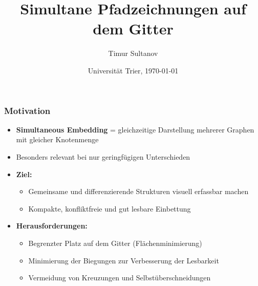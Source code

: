 \documentclass[9pt]{beamer}
\title{Simultane Pfadzeichnungen auf dem Gitter}
\author{Timur Sultanov}
\date{Universität Trier, \today}
\begin{document}
    \maketitle
    \begin{frame}
    \frametitle{Motivation}
    \begin{itemize}
        \item \textbf{Simultaneous Embedding} = gleichzeitige Darstellung mehrerer Graphen mit gleicher Knotenmenge
        \item Besonders relevant bei nur geringfügigen Unterschieden\pause 
        \item \textbf{Ziel:} 
        \begin{itemize}
            \item Gemeinsame und differenzierende Strukturen visuell erfassbar machen
            \item Kompakte, konfliktfreie und gut lesbare Einbettung
        \end{itemize}
        \item \textbf{Herausforderungen:}
        \begin{itemize}
            \item Begrenzter Platz auf dem Gitter (Flächenminimierung)
            \item Minimierung der Biegungen zur Verbesserung der Lesbarkeit
            \item Vermeidung von Kreuzungen und Selbstüberschneidungen
        \end{itemize}
    \end{itemize}
\end{frame}
\end{document}
